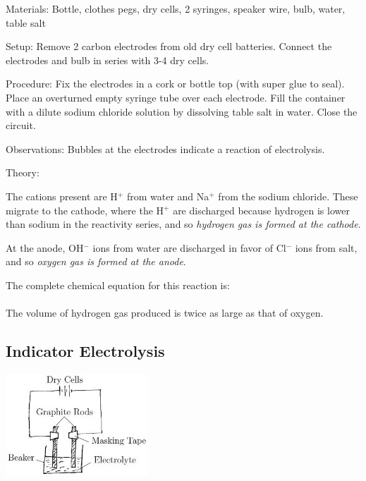 \begin{multicols}{2}
\begin{description*}
\item[Materials:]{Bottle, clothes pegs, dry cells, 2 syringes, speaker wire, bulb, water, table salt}
\item[Setup:]{Remove 2 carbon electrodes from old dry cell batteries. Connect the electrodes and bulb in series with 3-4 dry cells.}
\item[Procedure:]{Fix the electrodes in a cork or bottle top (with super glue to seal). Place an overturned empty syringe tube over each electrode. Fill the container with a dilute sodium chloride solution by dissolving table salt in water. Close the circuit.}
\item[Observations:]{Bubbles at the electrodes indicate a reaction of electrolysis.}
\item[Theory:]{The cations present are H$^+$ from water and Na$^+$ from the sodium chloride. These migrate to the cathode, where the H$^+$ are discharged because hydrogen is lower than sodium in the reactivity series, and so \emph{hydrogen gas is formed at the cathode}. 

At the anode, OH$^-$ ions from water are discharged in favor of Cl$^-$ ions from salt, and so \emph{oxygen gas is formed at the anode}.

The complete chemical equation for this reaction is:\\

\\

The volume of hydrogen gas produced is twice as large as that of oxygen.}
\end{description*}

\vfill
\columnbreak

\subsection{Indicator Electrolysis}

\begin{center}
\includegraphics[width=0.4\textwidth]{./img/electrolysis.jpg}
\end{center}


\end{multicols}
